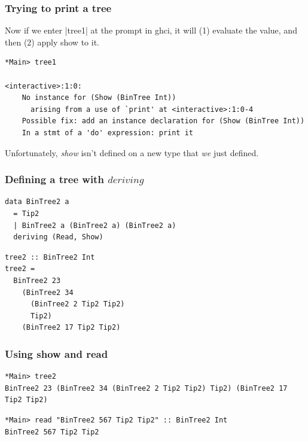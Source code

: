 \documentclass{beamer}
\begin{document}
\begin{frame}[fragile]
\frametitle{Trying to print a tree}

Now if we enter |tree1| at the prompt in ghci, it will (1) evaluate
the value, and then (2) apply show to it.

{\footnotesize
\begin{verbatim}
*Main> tree1

<interactive>:1:0:
    No instance for (Show (BinTree Int))
      arising from a use of `print' at <interactive>:1:0-4
    Possible fix: add an instance declaration for (Show (BinTree Int))
    In a stmt of a 'do' expression: print it
\end{verbatim}
}

Unfortunately, \emph{show} isn't defined on a new type that \emph{we}
just defined.

\end{frame}

\begin{frame}[fragile]
\frametitle{Defining a tree with $deriving$}

\begin{verbatim}
data BinTree2 a
  = Tip2
  | BinTree2 a (BinTree2 a) (BinTree2 a)
  deriving (Read, Show)
\end{verbatim}

\begin{verbatim}
tree2 :: BinTree2 Int
tree2 =
  BinTree2 23
    (BinTree2 34
      (BinTree2 2 Tip2 Tip2)
      Tip2)
    (BinTree2 17 Tip2 Tip2)
\end{verbatim}

\end{frame}

\begin{frame}[fragile]
\frametitle{Using show and read}

{\footnotesize
\begin{verbatim}
*Main> tree2
BinTree2 23 (BinTree2 34 (BinTree2 2 Tip2 Tip2) Tip2) (BinTree2 17 Tip2 Tip2)
\end{verbatim}
}

{\footnotesize
\begin{verbatim}
*Main> read "BinTree2 567 Tip2 Tip2" :: BinTree2 Int
BinTree2 567 Tip2 Tip2
\end{verbatim}
}

\end{frame}

\end{document}
